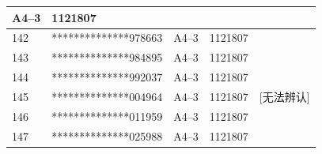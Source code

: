 \documentclass[UTF8,10pt,a4paper,fontset=fandol]{ctexart}
\newcommand{\fieldvalue}[1]{#1}
\newcommand{\handwritten}[1]{#1}
\begin{document}
\begin{center}
\begin{tabular}{|p{1.0cm}|p{3.8cm}|p{2.3cm}|p{2.8cm}|p{2.2cm}|}
\fieldvalue{A4--3} &
\fieldvalue{1121807} & \\ \hline
\fieldvalue{142} &
\fieldvalue{**************978663} &
\fieldvalue{A4--3} &
\fieldvalue{1121807} & \\ \hline
\fieldvalue{143} &
\fieldvalue{**************984895} &
\fieldvalue{A4--3} &
\fieldvalue{1121807} & \\ \hline
\fieldvalue{144} &
\fieldvalue{**************992037} &
\fieldvalue{A4--3} &
\fieldvalue{1121807} & \\ \hline
\fieldvalue{145} &
\fieldvalue{**************004964} &
\fieldvalue{A4--3} &
\fieldvalue{1121807} &
\fieldvalue{\handwritten{[无法辨认]}} \\ \hline
\fieldvalue{146} &
\fieldvalue{**************011959} &
\fieldvalue{A4--3} &
\fieldvalue{1121807} & \\ \hline
\fieldvalue{147} &
\fieldvalue{**************025988} &
\fieldvalue{A4--3} &
\fieldvalue{1121807} & \\ \hline

\end{tabular}
\end{center}
\end{document}

